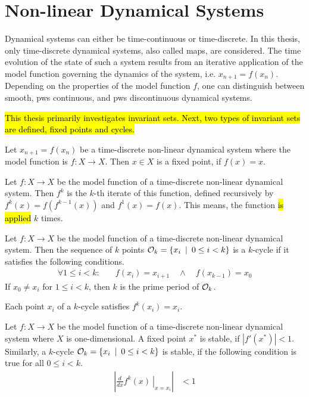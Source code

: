 \section{Non-linear Dynamical Systems}

Dynamical systems can either be time-continuous or time-discrete.
In this thesis, only time-discrete dynamical systems, also called maps, are considered.
The time evolution of the state of such a system results from an iterative application of the model function governing the dynamics of the system, i.e. $x_{n+1} = f(x_n)$.
Depending on the properties of the model function $f$, one can distinguish between smooth, \gls{pws} continuous, and \gls{pws} discontinuous dynamical systems.

\hl{
	This thesis primarily investigates invariant sets.
	Next, two types of invariant sets are defined, fixed points and cycles.
}

\begin{definition}
	Let $x_{n+1} = f(x_n)$ be a time-discrete non-linear dynamical system where the model function is $f: X \to X$.
	Then $x \in X$ is a fixed point, if $f(x) = x$.
\end{definition}

\begin{definition}
	Let $f: X \to X$ be the model function of a time-discrete non-linear dynamical system.
	Then $f^k$ is the $k$-th iterate of this function, defined recursively by $f^k(x) = f\left(f^{k-1}(x)\right)$ and $f^1(x) = f(x)$.
	This means, the function \hl{is applied} $k$ times.
\end{definition}

\begin{definition}[Cycle]
	Let $f: X \to X$ be the model function of a time-discrete non-linear dynamical system.
	Then the sequence of $k$ points $\mathcal{O}_k = \{x_i \:\mid\: 0 \leq i < k\}$ is a $k$-cycle if it satisfies the following conditions.
	\begin{align}
		\forall 1 \leq i < k: \quad & f(x_i) = x_{i+1} \quad \land \quad f(x_{k-1}) = x_0
	\end{align}
	If $x_0 \neq x_i$ for $1 \leq i < k$, then $k$ is the prime period of $\mathcal{O}_k$.
\end{definition}

Each point $x_i$ of a $k$-cycle satisfies $f^k(x_i) = x_i$.

\begin{definition}[Stability]
	Let $f: X \to X$ be the model function of a time-discrete non-linear dynamical system where $X$ is one-dimensional.
	A fixed point $x^*$ is stable, if $|f'(x^*)| < 1$.
	Similarly, a $k$-cycle $\mathcal{O}_k = \{x_i \:\mid\: 0 \leq i < k\}$ is stable, if the following condition is true for all $0 \leq i < k$.
	\begin{align}
		\left| \left. \frac{d}{dx}f^k(x) \:\right|_{x = x_i}\right| & < 1
	\end{align}
\end{definition}

